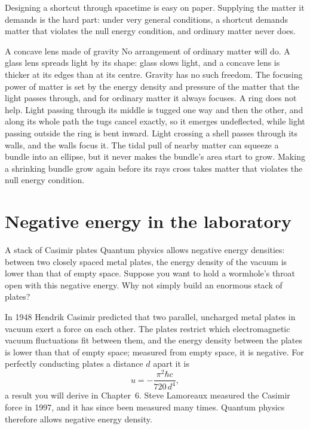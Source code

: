 \begin{keyidea}
Designing a shortcut through spacetime is easy on paper. Supplying the matter
it demands is the hard part: under very general conditions, a shortcut
demands matter that violates the null energy condition, and ordinary matter
never does.
\end{keyidea}

\begin{revisited}{A concave lens made of gravity}
No arrangement of ordinary matter will do. A glass lens spreads light by its
shape: glass slows light, and a concave lens is thicker at its edges than at
its centre. Gravity has no such freedom. The focusing power of matter is set
by the energy density and pressure of the matter that the light passes
through, and for ordinary matter it always focuses. A ring does not help.
Light passing through its middle is tugged one way and then the other, and
along its whole path the tugs cancel exactly, so it emerges undeflected, while
light passing outside the ring is bent inward. Light crossing a shell passes
through its walls, and the walls focus it. The tidal pull of nearby matter can
squeeze a bundle into an ellipse, but it never makes the bundle's area start
to grow. Making a shrinking bundle grow again before its rays cross takes
matter that violates the null energy condition.
\end{revisited}

\section{Negative energy in the laboratory}\label{sec:casimir}

\begin{thought}{A stack of Casimir plates}
Quantum physics allows negative energy densities: between two closely spaced
metal plates, the energy density of the vacuum is lower than that of empty
space. Suppose you want to hold a wormhole's throat open with this negative
energy. Why not simply build an enormous stack of plates?
\end{thought}

In 1948 Hendrik Casimir predicted that two parallel, uncharged metal plates in
vacuum exert a force on each other. The plates restrict which electromagnetic vacuum
fluctuations fit between them, and the energy density between the plates is
lower than that of empty space; measured from empty space, it is negative.
For perfectly conducting plates a distance $d$ apart it is
\begin{equation}
  u = -\frac{\pi^{2}\hbar c}{720\,d^{4}},
  \label{eq:casimir}
\end{equation}
a result you will derive in Chapter~6. Steve Lamoreaux measured the Casimir
force in 1997, and it has since been measured many times. Quantum physics
therefore allows negative energy density.

